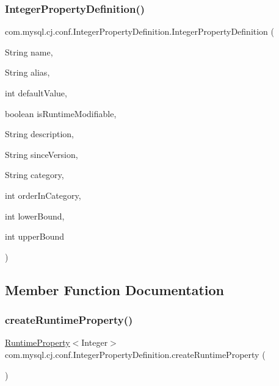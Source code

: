 \subsubsection{\texorpdfstring{Integer\+Property\+Definition()}{IntegerPropertyDefinition()}\hspace{0.1cm}{\footnotesize\ttfamily [2/2]}}
{\footnotesize\ttfamily com.\+mysql.\+cj.\+conf.\+Integer\+Property\+Definition.\+Integer\+Property\+Definition (\begin{DoxyParamCaption}\item[{String}]{name,  }\item[{String}]{alias,  }\item[{int}]{default\+Value,  }\item[{boolean}]{is\+Runtime\+Modifiable,  }\item[{String}]{description,  }\item[{String}]{since\+Version,  }\item[{String}]{category,  }\item[{int}]{order\+In\+Category,  }\item[{int}]{lower\+Bound,  }\item[{int}]{upper\+Bound }\end{DoxyParamCaption})}



\subsection{Member Function Documentation}
\mbox{\label{classcom_1_1mysql_1_1cj_1_1conf_1_1_integer_property_definition_a446876e16f36d1c1731cfdf5174b7942}} 
\subsubsection{\texorpdfstring{create\+Runtime\+Property()}{createRuntimeProperty()}}
{\footnotesize\ttfamily \mbox{\hyperlink{interfacecom_1_1mysql_1_1cj_1_1conf_1_1_runtime_property}{Runtime\+Property}}$<$Integer$>$ com.\+mysql.\+cj.\+conf.\+Integer\+Property\+Definition.\+create\+Runtime\+Property (\begin{DoxyParamCaption}{ }\end{DoxyParamCaption})}

